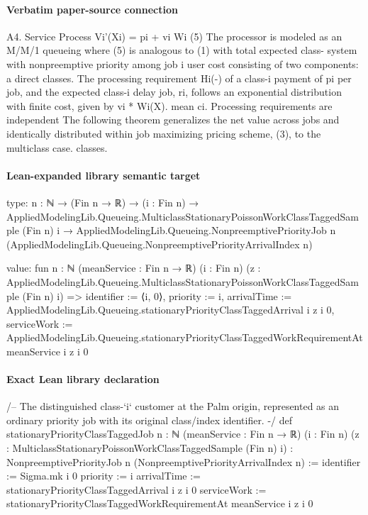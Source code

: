 \documentclass[10pt]{article}
\begin{document}
\paragraph{Verbatim paper-source connection}
\begin{ReviewVerbatim}
A4. Service Process                                                      Vi'(Xi) = pi + vi Wi (5)
The processor is modeled as an M/M/1 queueing                          where (5) is analogous to (1) with total expected class-
system with nonpreemptive priority among job                           i user cost consisting of two components: a direct
classes. The processing requirement Hi(-) of a class-i                 payment of pi per job, and the expected class-i delay
job, ri, follows an exponential distribution with finite cost, given by vi * Wi(X).
mean ci. Processing requirements are independent           The following theorem generalizes the net value
across jobs and identically distributed within job       maximizing pricing scheme, (3), to the multiclass case.
classes.
\end{ReviewVerbatim}



\paragraph{Lean-expanded library semantic target}
\begin{ReviewVerbatim}
type:
{n : ℕ} →
  (Fin n → ℝ) →
    (i : Fin n) →
      AppliedModelingLib.Queueing.MulticlassStationaryPoissonWorkClassTaggedSample (Fin n) i →
        AppliedModelingLib.Queueing.NonpreemptivePriorityJob n
          (AppliedModelingLib.Queueing.NonpreemptivePriorityArrivalIndex n)

value:
fun {n : ℕ} (meanService : Fin n → ℝ) (i : Fin n)
    (z : AppliedModelingLib.Queueing.MulticlassStationaryPoissonWorkClassTaggedSample (Fin n) i) =>
  { identifier := ⟨i, 0⟩, priority := i,
    arrivalTime := AppliedModelingLib.Queueing.stationaryPriorityClassTaggedArrival i z i 0,
    serviceWork := AppliedModelingLib.Queueing.stationaryPriorityClassTaggedWorkRequirementAt meanService i z i 0 }
\end{ReviewVerbatim}

\paragraph{Exact Lean library declaration}
\begin{ReviewVerbatim}
/-- The distinguished class-`i` customer at the Palm origin, represented as
an ordinary priority job with its original class/index identifier. -/
def stationaryPriorityClassTaggedJob
    {n : ℕ} (meanService : Fin n → ℝ) (i : Fin n)
    (z : MulticlassStationaryPoissonWorkClassTaggedSample (Fin n) i) :
    NonpreemptivePriorityJob n (NonpreemptivePriorityArrivalIndex n) :=
  { identifier := Sigma.mk i 0
    priority := i
    arrivalTime := stationaryPriorityClassTaggedArrival i z i 0
    serviceWork := stationaryPriorityClassTaggedWorkRequirementAt meanService i z i 0 }
\end{ReviewVerbatim}
\end{document}
